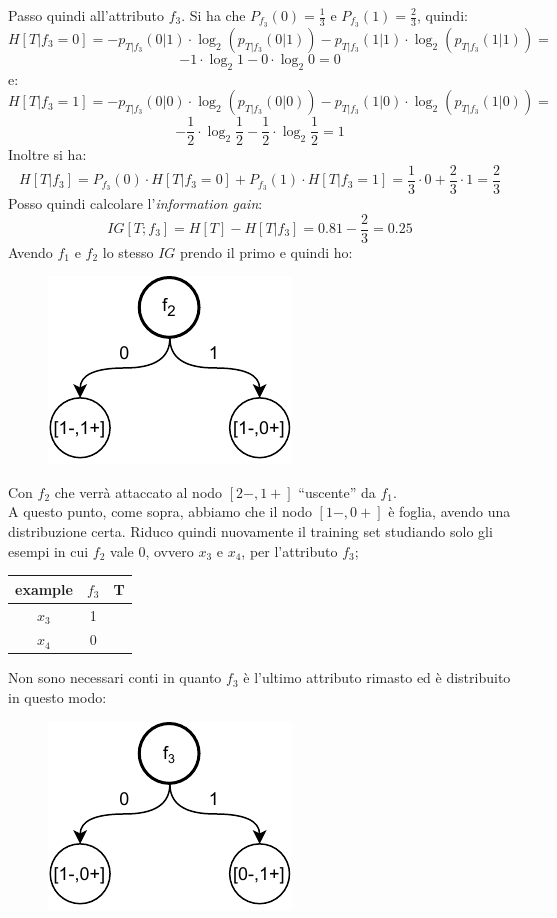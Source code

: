 \begin{esercizio}
  Passo quindi all'attributo $f_3$. Si ha che $P_{f_3}(0)=\frac{1}{3}$ e
  $P_{f_3}(1)=\frac{2}{3}$, quindi:
  \[H[T|f_3=0]=-p_{T|f_3}(0|1)\cdot \log_2(p_{T|f_3}(0|1))-p_{T|f_3}(1|1)\cdot
    \log_2(p_{T|f_3}(1|1))=\]
  \[-1\cdot \log_2 1-0\cdot \log_2 0=0\]
  e:
  \[H[T|f_3=1]=-p_{T|f_3}(0|0)\cdot \log_2(p_{T|f_3}(0|0))-p_{T|f_3}(1|0)\cdot
    \log_2(p_{T|f_3}(1|0))=\]
  \[-\frac{1}{2}\cdot \log_2 \frac{1}{2}-\frac{1}{2}\cdot \log_2 \frac{1}{2}=1\]
  Inoltre si ha:
  \[H[T|f_3]=P_{f_3}(0)\cdot H[T|f_3=0]+P_{f_3}(1)\cdot
    H[T|f_3=1]=\frac{1}{3}\cdot 0+\frac{2}{3}\cdot 1=\frac{2}{3}\]
  Posso quindi calcolare l'\textit{information gain}:
  \[IG[T;f_3]=H[T]-H[T|f_3]=0.81-\frac{2}{3}=0.25\]
  Avendo $f_1$ e $f_2$ lo stesso $IG$ prendo il primo e quindi ho:
  \begin{figure}[H]
    \centering
    \includegraphics[scale = 0.9]{img/id6.pdf}
  \end{figure}
  Con $f_2$ che verrà attaccato al nodo $[2-, 1+]$ ``uscente'' da $f_1$.\\
  A questo punto, come sopra, abbiamo che il nodo $[1-, 0+]$ è foglia, avendo una
  distribuzione certa. Riduco quindi nuovamente il training set studiando solo
  gli esempi in cui $f_2$ vale 0, ovvero $x_3$ e $x_4$, per l'attributo $f_3$;
  \begin{table}[H]
    \centering
    \begin{tabular}{c|c|c}
      example & $f_3$ & T\\
      \hline
      $x_3$ & 1 & \color{darkgreen}{1}\\
      $x_4$ & 0 & \color{red}{0}\\
    \end{tabular}
  \end{table}
  \newpage
  Non sono necessari conti in quanto $f_3$ è l'ultimo attributo rimasto ed è
  distribuito in questo modo:
  \begin{figure}[H]
    \centering
    \includegraphics[scale = 0.9]{img/id7.pdf}

\end{figure}
\end{esercizio}
